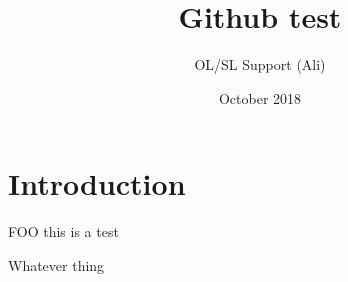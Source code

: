 \documentclass{article}
\title{Github test}
\author{OL/SL Support (Ali) }
\date{October 2018}
\begin{document}
\maketitle

\section{Introduction}

FOO this is a test

Whatever thing
\end{document}
